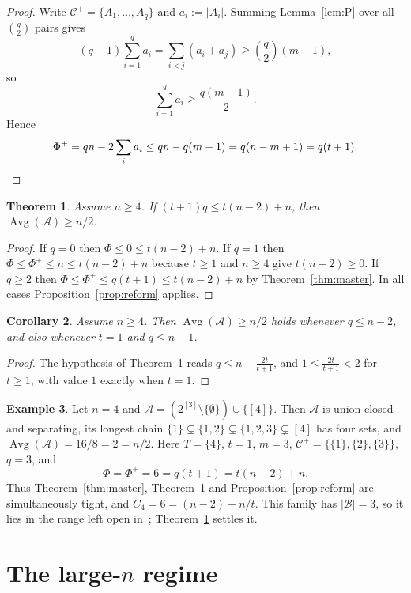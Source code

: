 \documentclass[11pt,a4paper]{amsart}
\theoremstyle{plain}
\newtheorem{theorem}{Theorem}[section]
\newtheorem{corollary}[theorem]{Corollary}
\theoremstyle{definition}
\newtheorem{example}[theorem]{Example}
\newcommand{\A}{\mathcal{A}}
\newcommand{\B}{\mathcal{B}}
\newcommand{\Cc}{\mathcal{C}}
\newcommand{\Avg}{\operatorname{Avg}}
\newcommand{\Cp}{\Cc^{+}}
\begin{document}
\begin{proof}
Write $\Cp=\{A_1,\dots,A_q\}$ and $a_i:=|A_i|$. Summing Lemma~\ref{lem:P} over
all $\binom q2$ pairs gives
\[
  (q-1)\sum_{i=1}^q a_i
  =
  \sum_{i<j}(a_i+a_j)
  \ge
  \binom q2(m-1),
\]
so
\[
  \sum_{i=1}^q a_i\ge\frac{q(m-1)}2.
\]
Hence
\[
  \Phi^+
  =qn-2\sum_i a_i
  \le qn-q(m-1)
  =q(n-m+1)
  =q(t+1). \qedhere
\]
\end{proof}

\begin{theorem}\label{thm:B}
Assume $n\ge4$. If $(t+1)q\le t(n-2)+n$, then $\Avg(\A)\ge n/2$.
\end{theorem}

\begin{proof}
If $q=0$ then $\Phi\le0\le t(n-2)+n$. If $q=1$ then
$\Phi\le\Phi^+\le n\le t(n-2)+n$ because $t\ge1$ and $n\ge4$ give
$t(n-2)\ge0$. If $q\ge2$ then $\Phi\le\Phi^+\le q(t+1)\le t(n-2)+n$ by
Theorem~\ref{thm:master}. In all cases Proposition~\ref{prop:reform} applies.
\end{proof}

\begin{corollary}\label{cor:count}
Assume $n\ge4$. Then $\Avg(\A)\ge n/2$ holds whenever $q\le n-2$, and also whenever $t=1$ and
$q\le n-1$.
\end{corollary}

\begin{proof}
The hypothesis of Theorem~\ref{thm:B} reads $q\le n-\frac{2t}{t+1}$, and
$1\le\frac{2t}{t+1}<2$ for $t\ge1$, with value $1$ exactly when $t=1$.
\end{proof}

\begin{example}\label{ex:sharp}
Let $n=4$ and $\A=(2^{[3]}\setminus\{\emptyset\})\cup\{[4]\}$. Then $\A$ is
union-closed and separating, its longest chain
$\{1\}\subsetneq\{1,2\}\subsetneq\{1,2,3\}\subsetneq[4]$ has four sets, and
$\Avg(\A)=16/8=2=n/2$. Here $T=\{4\}$, $t=1$, $m=3$,
$\Cp=\{\{1\},\{2\},\{3\}\}$, $q=3$, and
\[
  \Phi=\Phi^+=6=q(t+1)=t(n-2)+n.
\]
Thus Theorem~\ref{thm:master}, Theorem~\ref{thm:B} and
Proposition~\ref{prop:reform} are simultaneously tight, and
$\widetilde C_4=6=(n-2)+n/t$. This family has $|\B|=3$, so it lies in the range
left open in~\cite{Bouchard}; Theorem~\ref{thm:B} settles it.
\end{example}

\section{The large-\texorpdfstring{$n$}{n} regime}\label{sec:large}
\end{document}

